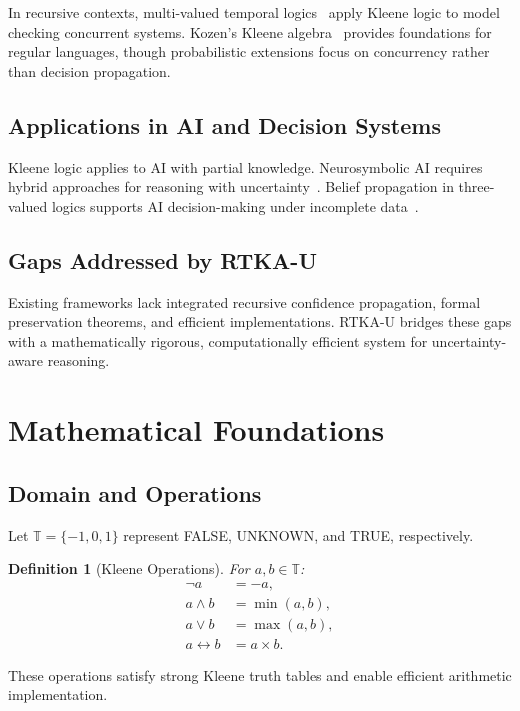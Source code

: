 \documentclass[11pt,a4paper]{article}
\newtheorem{definition}{Definition}
\begin{document}
In recursive contexts, multi-valued temporal logics~\cite{chechik2001} apply Kleene logic to model checking concurrent systems. Kozen's Kleene algebra~\cite{kozen1994} provides foundations for regular languages, though probabilistic extensions focus on concurrency rather than decision propagation.

\subsection{Applications in AI and Decision Systems}

Kleene logic applies to AI with partial knowledge. Neurosymbolic AI requires hybrid approaches for reasoning with uncertainty~\cite{neurosymbolic2025}. Belief propagation in three-valued logics supports AI decision-making under incomplete data~\cite{belief2022}.

\subsection{Gaps Addressed by RTKA-U}

Existing frameworks lack integrated recursive confidence propagation, formal preservation theorems, and efficient implementations. RTKA-U bridges these gaps with a mathematically rigorous, computationally efficient system for uncertainty-aware reasoning.

\section{Mathematical Foundations}

\subsection{Domain and Operations}

Let $\mathbb{T} = \{-1, 0, 1\}$ represent FALSE, UNKNOWN, and TRUE, respectively.

\begin{definition}[Kleene Operations]
For $a, b \in \mathbb{T}$:
\begin{align}
    \neg a &= -a, \\
    a \land b &= \min(a, b), \\
    a \lor b &= \max(a, b), \\
    a \leftrightarrow b &= a \times b.
\end{align}
\end{definition}

These operations satisfy strong Kleene truth tables and enable efficient arithmetic implementation.
\end{document}
